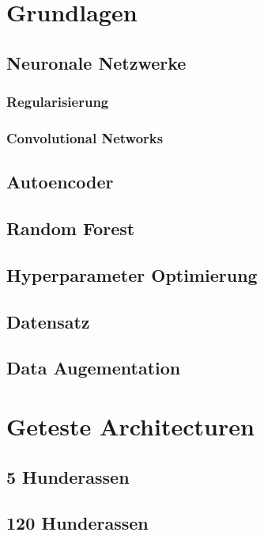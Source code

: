 \section{Grundlagen}

\subsection{Neuronale Netzwerke}

\subsubsection{Regularisierung}

\subsubsection{Convolutional Networks}

\subsection{Autoencoder}

\subsection{Random Forest}

\subsection{Hyperparameter Optimierung}
\subsection{Datensatz}

\subsection{Data Augementation}

\section{Geteste Architecturen}

\subsection{5 Hunderassen}

\subsection{120 Hunderassen}
